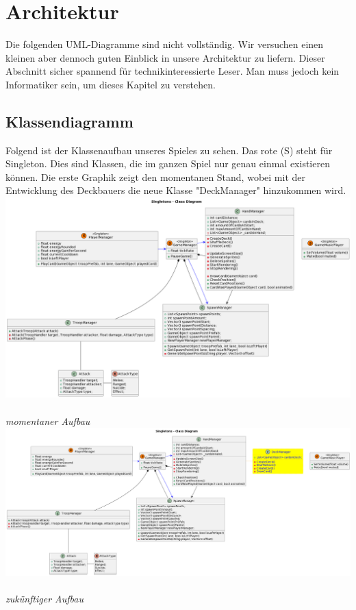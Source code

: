 \chapter{Architektur}
Die folgenden UML-Diagramme sind nicht vollständig.
Wir versuchen einen kleinen aber dennoch guten Einblick in unsere Architektur zu liefern.
Dieser Abschnitt sicher spannend für technikinteressierte Leser. Man muss jedoch kein Informatiker sein, um dieses Kapitel zu verstehen.

\section{Klassendiagramm}
Folgend ist der Klassenaufbau unseres Spieles zu sehen.
Das rote (S) steht für Singleton.
Dies sind Klassen, die im ganzen Spiel nur genau einmal existieren können.
Die erste Graphik zeigt den momentanen Stand, wobei mit der Entwicklung des Deckbauers die neue Klasse "DeckManager" hinzukommen wird. \\
\includegraphics[width=14cm]{resources/Singletons.png} \\
\textit{momentaner Aufbau} \\
\includegraphics[width=14.5cm]{resources/Singletons 2.png} \\
\textit{zukünftiger Aufbau}

